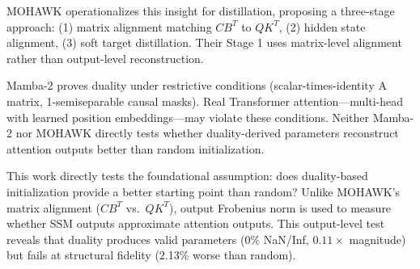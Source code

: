 MOHAWK \citep{waleffe2024mohawk} operationalizes this insight for distillation, proposing a three-stage approach: (1) matrix alignment matching $CB^T$ to $QK^T$, (2) hidden state alignment, (3) soft target distillation. Their Stage 1 uses matrix-level alignment rather than output-level reconstruction.

Mamba-2 proves duality under restrictive conditions (scalar-times-identity A matrix, 1-semiseparable causal masks). Real Transformer attention---multi-head with learned position embeddings---may violate these conditions. Neither Mamba-2 nor MOHAWK directly tests whether duality-derived parameters reconstruct attention outputs better than random initialization.

This work directly tests the foundational assumption: does duality-based initialization provide a better starting point than random? Unlike MOHAWK's matrix alignment ($CB^T$ vs.\ $QK^T$), output Frobenius norm is used to measure whether SSM outputs approximate attention outputs. This output-level test reveals that duality produces valid parameters (0\% NaN/Inf, 0.$11\times$ magnitude) but fails at structural fidelity (2.13\% worse than random).
